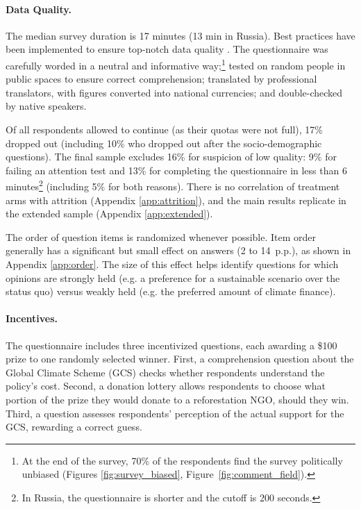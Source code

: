 \documentclass[12pt,english]{article}
\begin{document}
\begin{bibunit}
\paragraph{Data Quality.}\label{par:data_quality}
The median survey duration is 17 minutes (13 min in Russia).
Best practices have been implemented to ensure top-notch data quality \citep{stantcheva_how_2023}.
The questionnaire was carefully worded in a neutral and informative way;\footnote{At the end of the survey, 70\% of the respondents find the survey politically unbiased (Figures \ref{fig:survey_biased}, Figure~\ref{fig:comment_field}).} tested on random people in public spaces to ensure correct comprehension; translated by professional translators, with figures converted into national currencies; and double-checked by native speakers.

Of all respondents allowed to continue (as their quotas were not full), 17\% dropped out (including 10\% who dropped out after the socio-demographic questions). The final sample excludes 16\% for suspicion of low quality: 9\% for failing an attention test and 13\% for completing the questionnaire in less than 6 minutes\footnote{%
In Russia, the questionnaire is shorter and the cutoff is 200 seconds. %
} (including 5\% for both reasons).
There is no correlation of treatment arms with attrition (Appendix \ref{app:attrition}), and the main results replicate in the extended sample (Appendix \ref{app:extended}).

The order of question items is randomized whenever possible. Item order generally has a significant but small effect on answers (2 to 14~p.p.), as shown in Appendix \ref{app:order}. The size of this effect helps identify questions for which opinions are strongly held (e.g. a preference for a sustainable scenario over the status quo) versus weakly held (e.g. the preferred amount of climate finance).

\paragraph{Incentives.}
The questionnaire includes three incentivized questions, each awarding a \$100 prize to one randomly selected winner. First, a comprehension question about the Global Climate Scheme (GCS) checks whether respondents understand the policy's cost.
Second, a donation lottery allows respondents to choose what portion of the prize they would donate to a reforestation NGO, should they win. Third, a question assesses respondents' perception of the actual support for the GCS, rewarding a correct guess.


\end{bibunit}
\end{document}
